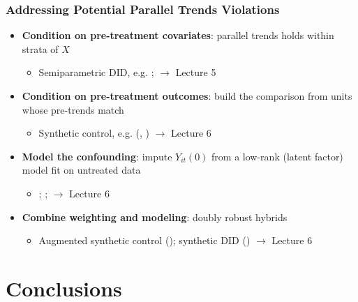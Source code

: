 \documentclass[xcolor=svgnames,9pt,english, aspectratio=169]{beamer}
\begin{document}
\begin{frame}
  \frametitle{Addressing Potential Parallel Trends Violations}
\begin{itemize}[<+->]\itemsep0.9em
\item \textbf{Condition on pre-treatment covariates}: parallel trends holds within strata of $X$
\begin{itemize}\itemsep0.4em
  \item Semiparametric DID, e.g. \alert{\textcite{abadie2005semiparametric}; \textcite{callaway2021difference}} $\rightarrow$ Lecture 5
\end{itemize}
\item \textbf{Condition on pre-treatment outcomes}: build the comparison from units whose pre-trends match
\begin{itemize}\itemsep0.4em
  \item Synthetic control, e.g. \alert{ (\citeyear{abadie2010synthetic}, \citeyear{abadie2015comparative})} $\rightarrow$ Lecture 6
\end{itemize}
\item \textbf{Model the confounding}: impute $Y_{it}(0)$ from a low-rank (latent factor) model fit on untreated data
\begin{itemize}\itemsep0.4em
  \item \alert{\textcite{gobillon2016regional}; \textcite{xu2017generalized}; \textcite{athey2021matrix}} $\rightarrow$ Lecture 6
\end{itemize}
\item \textbf{Combine weighting and modeling}: doubly robust hybrids
\begin{itemize}\itemsep0.4em
  \item Augmented synthetic control (\alert{}); synthetic DID (\alert{\cite{arkhangelsky2021synthetic}}) $\rightarrow$ Lecture 6
\end{itemize}
\end{itemize}
\end{frame}


\section{Conclusions}
\end{document}
